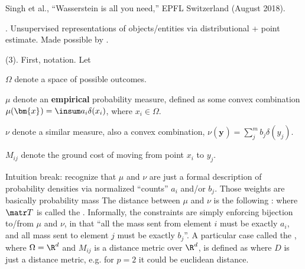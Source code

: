 \documentclass[11pt]{article}
\renewcommand\vec[2][]{\bm{#2}_{#1}}
\newcommand\myspace[1][]{\vspace{#1\bigskipamount}}
\newcommand\p{\Needspace{10\baselineskip} \noindent}
\begin{document}
\vspace{-1em}
{\footnotesize Singh et al., ``Wasserstein is all you need,''  EPFL Switzerland (August 2018).}

\p {}. Unsupervised representations of objects/entities via distributional + point estimate. Made possible by . 

\myspace
\p {} (3). First, notation. Let\textellipsis
\begin{compactitem}
	\item $\Omega$ denote a space of possible outcomes. 
	
	\item $\mu$ denote an \textbf{empirical} probability measure, defined as some convex combination $\mu(\vec x) = \insum a_i \delta(x_i)$, where $x_i \in \Omega$. 
	
	\item $\nu$ denote a similar measure, also a convex combination, $\nu(\vec y) = \sum_j^m b_j \delta(y_j)$. 
	
	\item $M_{ij}$ denote the ground cost of moving from point $x_i$ to $y_j$. 
\end{compactitem}
Intuition break: recognize that $\mu$ and $\nu$ are just a formal description of probability densities via normalized ``counts'' $a_i$ and/or $b_j$. Those weights are basically probability mass The  distance between $\mu$ and $\nu$ is the following :
where $\matr T$ is called the . Informally, the constraints are simply enforcing bijection to/from $\mu$ and $\nu$, in that ``all the mass sent from element $i$ must be exactly $a_i$, and all mass sent to element $j$ must be exactly $b_j$''. A particular case called the , where $\Omega = \R^d$ and $M_{ij}$ is a distance metric over $\R^d$, is defined as
where $D$ is just a distance metric, e.g. for $p=2$ it could be euclidean distance. 
\end{document}
